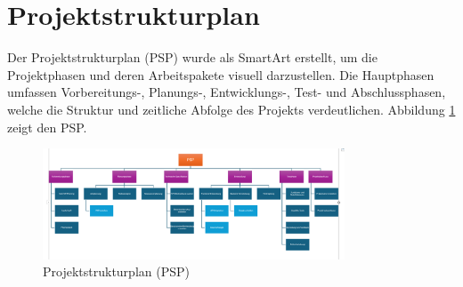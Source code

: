 \documentclass[ngerman]{report}
\begin{document}
    \section{Projektstrukturplan}
    Der Projektstrukturplan (PSP) wurde als SmartArt erstellt, um die Projektphasen und deren 
    Arbeitspakete visuell darzustellen. Die Hauptphasen umfassen Vorbereitungs-,
    Planungs-, Entwicklungs-, Test- und Abschlussphasen, welche die Struktur und
    zeitliche Abfolge des Projekts verdeutlichen. Abbildung \ref{fig:Abbildung 3} zeigt den PSP.


    \begin{figure}
        \centering
        \includegraphics[width=0.8\textwidth]{images/PSP.png}
        \caption{Projektstrukturplan (PSP)}
        \label{fig:Abbildung 3}
    \end{figure}
    
    

 
\end{document}
